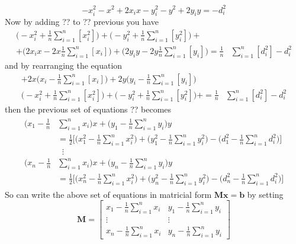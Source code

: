 \documentclass[12pt,twoside]{report}
\begin{document}
\begin{equation}
-x_i^2-x^2+2x_ix-y_i^2-y^2+2y_iy=-d_i^2      
\end{equation}
Now by adding ?? to ?? previous you have 
\begin{equation}
\begin{split}
    \bigg(-x_i^2  + \frac{1}{n}\sum_{i=1}^n[x_i^2]\bigg)+
    \bigg(-y_i^2+ \frac{1}{n}\sum_{i=1}^n[y_i^2]\bigg)+\\
    +\bigg(2x_ix-2x\frac{1}{n}\sum_{i=1}^n[x_i]\bigg)+
    \bigg(2y_iy -2y\frac{1}{n}\sum_{i=1}^n[y_i]\bigg)
    =\frac{1}{n}&\sum_{i=1}^n[d_i^2]-d_i^2
\end{split}    
\end{equation}
and by rearranging the equation
\begin{equation}
\begin{split}
    +2x\bigg(x_i-\frac{1}{n}\sum_{i=1}^n[x_i]\bigg)+
    2y\bigg(y_i -\frac{1}{n}\sum_{i=1}^n[y_i]\bigg)\\
    \bigg(-x_i^2  + \frac{1}{n}\sum_{i=1}^n[x_i^2]\bigg)+
    \bigg(-y_i^2+ \frac{1}{n}\sum_{i=1}^n[y_i^2]\bigg)+
    =\frac{1}{n}&\sum_{i=1}^n[d_i^2]-d_i^2
\end{split}    
\end{equation}
then the previous set of equations ?? becomes
\begin{align}
\begin{split} 
    \bigg(x_1-\frac{1}{n}&\sum_{i=1}^nx_i\bigg)x+\bigg(y_1-\frac{1}{n}\sum_{i=1}^ny_i\bigg)y\\
    &=\frac{1}{2}\bigg[\bigg(x_1^2-\frac{1}{n}\sum_{i=1}^nx^2_i\bigg)+\bigg(y_1^2-\frac{1}{n}\sum_{i=1}^ny^2_i\bigg)-\bigg(d_1^2-\frac{1}{n}\sum_{i=1}^nd_i^2\bigg)\bigg]\\
&\;\;\vdots\\
    \bigg(x_n-\frac{1}{n}&\sum_{i=1}^nx_i\bigg)x+\bigg(y_n-\frac{1}{n}\sum_{i=1}^ny_i\bigg)y\\
    &=\frac{1}{2}\bigg[\bigg(x_n^2-\frac{1}{n}\sum_{i=1}^nx^2_i\bigg)+\bigg(y_n^2-\frac{1}{n}\sum_{i=1}^ny^2_i\bigg)-\bigg(d_n^2-\frac{1}{n}\sum_{i=1}^nd_i^2\bigg)\bigg]
\end{split}
\end{align}
So can write the above set of equations in matricial form $\mathbf{Mx}=\mathbf{b}$ by setting
$$
\mathbf{M}=\begin{bmatrix}
    x_1-\frac{1}{n}\sum_{i=1}^nx_i&y_1-\frac{1}{n}\sum_{i=1}^ny_i\\
    \vdots&\vdots\\
    x_n-\frac{1}{n}\sum_{i=1}^nx_i&y_n-\frac{1}{n}\sum_{i=1}^ny_i
\end{bmatrix}
$$
\end{document}
